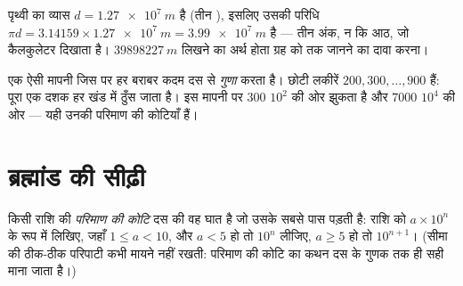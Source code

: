 \begin{example}[पृथ्वी की परिधि]\label{ex:g10:orders-of-magnitude:sigfig}
पृथ्वी का व्यास $d = \qty{1.27e7}{m}$ है (तीन ), इसलिए उसकी परिधि
$\pi d = \num{3.14159} \times \qty{1.27e7}{m} = \qty{3.99e7}{m}$ है --- तीन अंक, न कि आठ, जो कैलकुलेटर दिखाता है। $\qty{39898227}{m}$ लिखने का
अर्थ होता ग्रह को  तक जानने का दावा करना।
\end{example}

\begin{omfigure}

{\small एक ऐसी मापनी जिस पर हर बराबर कदम दस से \emph{गुणा} करता है।
छोटी लकीरें $200, 300, \dots, 900$ हैं: पूरा एक दशक हर खंड में ठुँस जाता है। इस मापनी
पर $\num{300}$ $10^{2}$ की ओर झुकता है और $\num{7000}$ $10^{4}$ की ओर --- यही उनकी
परिमाण की कोटियाँ हैं।}
\end{omfigure}

\section{ब्रह्मांड की सीढ़ी}

\begin{definition}[परिमाण की कोटि]\label{def:g10:orders-of-magnitude:oom}
किसी राशि की \emph{परिमाण की कोटि} दस की वह घात
है जो उसके सबसे पास पड़ती है: राशि को $a \times 10^{n}$ के रूप में लिखिए, जहाँ
$1 \leq a < 10$, और $a < 5$ हो तो $10^{n}$ लीजिए, $a \geq 5$ हो तो $10^{n+1}$। (सीमा की
ठीक-ठीक परिपाटी कभी मायने नहीं रखती: परिमाण की कोटि का कथन दस के गुणक
तक ही सही माना जाता है।)
\end{definition}

